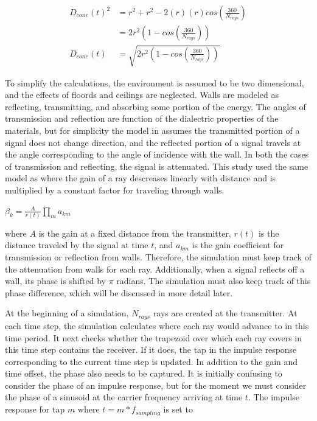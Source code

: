 \documentclass[article,11pt,onecolumn,final]{IEEEtran}
\begin{document}
\begin{align*}
D_{cone}(t)^2 &= r^2 + r^2 - 2(r)(r)cos(\frac{360}{N_{rays}}) \\
              &= 2r^2(1 - cos(\frac{360}{N_{rays}})) \\
D_{cone}(t) &= \sqrt{2r^2(1 - cos(\frac{360}{N_{rays}}))}
\end{align*}

To simplify the calculations, the environment is assumed to be two dimensional, and the effects of floords and ceilings are neglected. Walls are modeled as reflecting, transmitting, and absorbing some portion of the energy. The angles of transmission and reflection are function of the dialectric properties of the materials, but for simplicity the model in \cite{Holt} assumes the transmitted portion of a signal does not change direction, and the reflected portion of a signal travels at the angle corresponding to the angle of incidence with the wall. In both the cases of transmission and reflecting, the signal is attenuated. This study used the same model as \cite{Holt} where the gain of a ray descreases linearly with distance and is multiplied by a constant factor for traveling through walls.

$ \beta_k = \frac{A}{r(t)} \prod_m a_{km} $

where $A$ is the gain at a fixed distance from the transmitter, $r(t)$ is the distance traveled by the signal at time $t$, and $a_{km}$ is the gain coefficient for transmission or reflection from walls. Therefore, the simulation must keep track of the attenuation from walls for each ray. Additionally, when a signal reflects off a wall, its phase is shifted by $\pi$ radians. The simulation must also keep track of this phase difference, which will be discussed in more detail later.

At the beginning of a simulation, $N_{rays}$ rays are created at the transmitter. At each time step, the simulation calculates where each ray would advance to in this time period. It next checks whether the trapezoid over which each ray covers in this time step contains the receiver. If it does, the tap in the impulse response corresponding to the current time step is updated. In addition to the gain and time offset, the phase also needs to be captured. It is initially confusing to consider the phase of an impulse response, but for the moment we must consider the phase of a sinusoid at the carrier frequency arriving at time $t$. The impulse response for tap $m$ where $t=m*f_{sampling}$ is set to 
\end{document}
